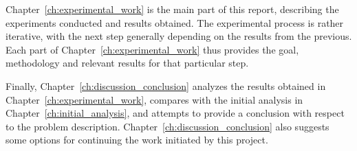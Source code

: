 \noindent
Chapter~\ref{ch:experimental_work} is the main part of this report, describing the experiments conducted and results obtained. The experimental process is rather iterative, with the next step generally depending on the results from the previous. Each part of Chapter~\ref{ch:experimental_work} thus provides the goal, methodology and relevant results for that particular step.

\noindent
Finally, Chapter~\ref{ch:discussion_conclusion} analyzes the results obtained in Chapter~\ref{ch:experimental_work}, compares with the initial analysis in Chapter~\ref{ch:initial_analysis}, and attempts to provide a conclusion with respect to the problem description. Chapter~\ref{ch:discussion_conclusion} also suggests some options for continuing the work initiated by this project.